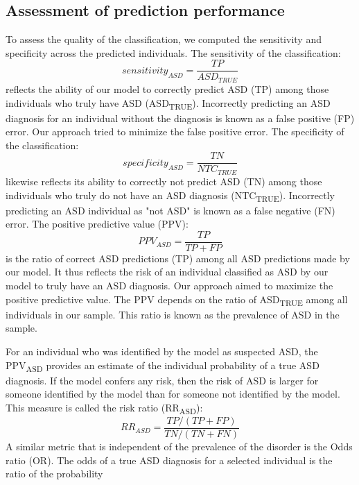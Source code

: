 \documentclass[9pt,lineno]{elife}
\begin{document}
\subsection{Assessment of prediction performance}
To assess the quality of the classification, we computed the sensitivity and specificity across the predicted individuals. The sensitivity of the classification:
\begin{equation}
\label{eq:sens_ASD}
sensitivity_{ASD} = \frac{TP}{ASD_{TRUE}}
\end{equation}
reflects the ability of our model to correctly predict ASD (TP) among those individuals who truly have ASD (ASD\textsubscript{TRUE}). Incorrectly predicting an ASD diagnosis for an individual without the diagnosis is known as a false positive (FP) error. Our approach tried to minimize the false positive error. The specificity of the classification: 
\begin{equation}
\label{eq:spec_ASD}
specificity_{ASD} = \frac{TN}{NTC_{TRUE}}
\end{equation}
likewise reflects its ability to correctly not predict ASD (TN) among those individuals who truly do not have an ASD diagnosis (NTC\textsubscript{TRUE}). Incorrectly predicting an ASD individual as "not ASD" is known as a false negative (FN) error. The positive predictive value (PPV):
\begin{equation}
\label{eq:ppv_ASD}
PPV_{ASD} = \frac{TP}{TP+FP}
\end{equation}
is the ratio of correct ASD predictions (TP) among all ASD predictions made by our model. It thus reflects the risk of an individual classified as ASD by our model to truly have an ASD diagnosis. Our approach aimed to maximize the positive predictive value. The PPV depends on the ratio of ASD\textsubscript{TRUE} among all individuals in our sample. This ratio is known as the prevalence of ASD in the sample. 

For an individual who was identified by the model as suspected ASD, the PPV\textsubscript{ASD} provides an estimate of the individual probability of a true ASD diagnosis. If the model confers any risk, then the risk of ASD is larger for someone identified by the model than for someone not identified by the model. This measure is called the risk ratio (RR\textsubscript{ASD}):
\begin{equation}
\label{eq:risk_ratio}
RR_{ASD} = \frac{TP/(TP+FP)}{TN/(TN+FN)}
\end{equation}
A similar metric that is independent of the prevalence of the disorder is the Odds ratio (OR). The odds of a true ASD diagnosis for a selected individual is the ratio of the probability
\end{document}
